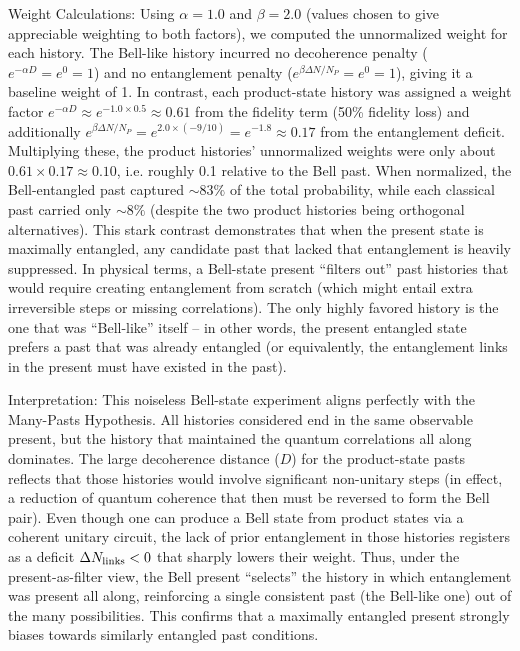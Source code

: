 \documentclass[11pt]{article}
\begin{document}
Weight Calculations: Using $\alpha = 1.0$ and $\beta = 2.0$ (values chosen to give appreciable weighting to both factors), we computed the unnormalized weight for each history. The Bell-like history incurred no decoherence penalty ($e^{-\alpha D}=e^0=1$) and no entanglement penalty ($e^{\beta \Delta N/N_P}=e^0=1$), giving it a baseline weight of 1. In contrast, each product-state history was assigned a weight factor $e^{-\alpha D} \approx e^{-1.0\times0.5} \approx 0.61$ from the fidelity term (50\% fidelity loss) and additionally $e^{\beta \Delta N/N_P} = e^{2.0 \times (-9/10)} = e^{-1.8} \approx 0.17$ from the entanglement deficit. Multiplying these, the product histories’ unnormalized weights were only about $0.61 \times 0.17 \approx 0.10$, i.e. roughly 0.1 relative to the Bell past. When normalized, the Bell-entangled past captured $\sim 83\%$ of the total probability, while each classical past carried only $\sim 8\%$ (despite the two product histories being orthogonal alternatives)​. This stark contrast demonstrates that when the present state is maximally entangled, any candidate past that lacked that entanglement is heavily suppressed. In physical terms, a Bell-state present “filters out” past histories that would require creating entanglement from scratch (which might entail extra irreversible steps or missing correlations). The only highly favored history is the one that was “Bell-like” itself – in other words, the present entangled state prefers a past that was already entangled (or equivalently, the entanglement links in the present must have existed in the past).

Interpretation: This noiseless Bell-state experiment aligns perfectly with the Many-Pasts Hypothesis. All histories considered end in the same observable present, but the history that maintained the quantum correlations all along dominates. The large decoherence distance ($D$) for the product-state pasts reflects that those histories would involve significant non-unitary steps (in effect, a reduction of quantum coherence that then must be reversed to form the Bell pair). Even though one can produce a Bell state from product states via a coherent unitary circuit, the lack of prior entanglement in those histories registers as a deficit $\Delta N_{\rm links} < 0$ that sharply lowers their weight. Thus, under the present-as-filter view, the Bell present “selects” the history in which entanglement was present all along, reinforcing a single consistent past (the Bell-like one) out of the many possibilities. This confirms that a maximally entangled present strongly biases towards similarly entangled past conditions.
\end{document}
